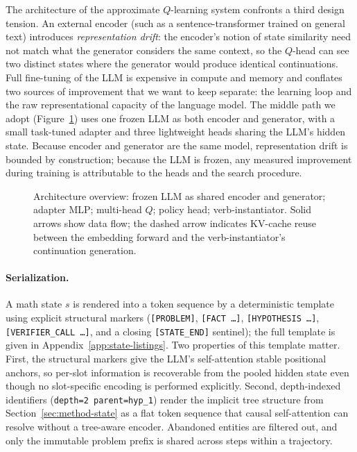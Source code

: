 The architecture of the approximate $Q$-learning system confronts a
third design tension. An external encoder (such as a sentence-transformer
trained on general text) introduces \emph{representation drift}: the
encoder's notion of state similarity need not match what the generator
considers the same context, so the $Q$-head can see two distinct states
where the generator would produce identical continuations. Full
fine-tuning of the LLM is expensive in compute and memory and conflates
two sources of improvement that we want to keep separate: the learning
loop and the raw representational capacity of the language model. The
middle path we adopt (Figure~\ref{fig:architecture}) uses one frozen LLM
as both encoder and generator, with a small task-tuned adapter and three
lightweight heads sharing the LLM's hidden state. Because encoder and
generator are the same model, representation drift is bounded by
construction; because the LLM is frozen, any measured improvement during
training is attributable to the heads and the search procedure.

\begin{figure}[t]
\centering

\caption{Architecture overview: frozen LLM as shared encoder and
  generator; adapter MLP; multi-head $Q$; policy head; verb-instantiator.
  Solid arrows show data flow; the dashed arrow indicates KV-cache reuse
  between the embedding forward and the verb-instantiator's continuation
  generation.}
\label{fig:architecture}
\end{figure}

\paragraph{Serialization.}
A math state $s$ is rendered into a token sequence by a deterministic
template using explicit structural markers (\texttt{[PROBLEM]},
\texttt{[FACT \ldots]}, \texttt{[HYPOTHESIS \ldots]},
\texttt{[VERIFIER\_CALL \ldots]}, and a closing \texttt{[STATE\_END]}
sentinel); the full template is given in
Appendix~\ref{app:state-listings}. Two properties of this template
matter. First, the structural markers
give the LLM's self-attention stable positional anchors, so per-slot
information is recoverable from the pooled hidden state even though no
slot-specific encoding is performed explicitly. Second, depth-indexed
identifiers (\texttt{depth=2 parent=hyp\_1}) render the implicit tree
structure from Section~\ref{sec:method-state} as a flat token sequence
that causal self-attention can resolve without a tree-aware encoder.
Abandoned entities are filtered out, and only the immutable problem
prefix is shared across steps within a trajectory.

